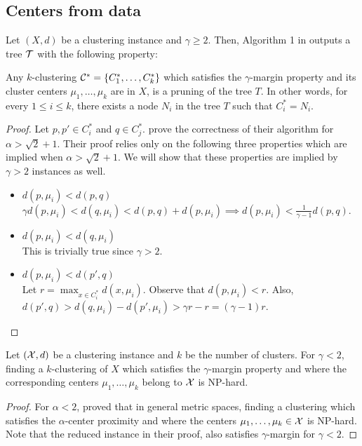 \subsection{Centers from data}
\begin{theorem}
\label{thm:upperCenterData}
Let $(X , d)$ be a clustering instance and $\gamma \ge 2$. Then, Algorithm 1 in \cite{balcan2012clustering} outputs a tree $\mathcal T$ with the following property: 


Any $k$-clustering $\mathcal C^* = \{C_1^*, \ldots, C_k^* \}$ which satisfies the $\gamma$-margin property and its cluster centers $\mu_1, \ldots, \mu_k$ are in $X$, is a pruning of the tree $T$. In other words, for every $1 \le i \le k$, there exists a node $N_i$ in the tree $T$ such that $C_i^* = N_i$.
\end{theorem}

\begin{proof}
Let $p, p' \in C_i^*$ and $q \in C_j^*$. \cite{balcan2012clustering} prove the correctness of their algorithm for $\alpha > \sqrt{2} + 1$. Their proof relies only on the following three properties which are implied when $\alpha > \sqrt{2} + 1$. We will show that these properties are implied by $\gamma > 2$ instances as well.
\begin{itemize}[nolistsep,noitemsep]
\item $d(p, \mu_i) < d(p, q)$\\
$\gamma d(p, \mu_i) < d(q, \mu_i) < d(p, q) + d(p, \mu_i) \implies d(p, \mu_i) < \frac{1}{\gamma-1}d(p, q)$.
\item $d(p, \mu_i) < d(q, \mu_i)$\\
This is trivially true since $\gamma > 2$.
\item $d(p, \mu_i) < d(p', q)$\\
Let $r = \max_{x \in C_i^*} d(x, \mu_i)$. Observe that $d(p, \mu_i) < r$. Also, $d(p', q)> d(q, \mu_i)-d(p', \mu_i) > \gamma r - r = (\gamma -1)r$.
\end{itemize}
\end{proof}

\begin{theorem}
\label{thm:lowerCenterData}
Let $(\mathcal X, d)$ be a clustering instance and $k$ be the number of clusters. For $\gamma < 2$, finding a $k$-clustering of $X$ which satisfies the $\gamma$-margin property and where the corresponding centers $\mu_1, \ldots, \mu_k$ belong to $\mathcal X$ is NP-hard.
\end{theorem}
\begin{proof}
For $\alpha < 2$, \cite{ben2014data} proved that in general metric spaces, finding a clustering which satisfies the $\alpha$-center proximity and where the centers $\mu_1, \ldots, \mu_k \in \mathcal X$ is NP-hard. Note that the reduced instance in their proof, also satisfies $\gamma$-margin for $\gamma < 2$. 
\end{proof}

